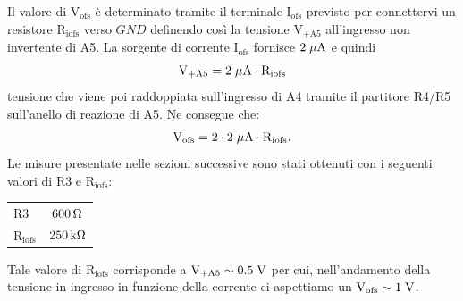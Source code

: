 Il valore di $\mathrm{V_{ofs}}$ è determinato tramite il terminale $\mathrm{I_{ofs}}$ previsto per connettervi un resistore $\mathrm{R_{iofs}}$ verso $GND$ definendo cos\`i la tensione $\mathrm{V_{+A5}}$ all'ingresso non invertente di A5. La sorgente di corrente $\mathrm{I_{ofs}}$ fornisce $2\; \mu \rm A$ e quindi
\begin{equation}
\label{eq:V+a5}
\mathrm{V_{+A5} = 2 \; \mu \rm A \cdot R_{iofs}}
\end{equation}
tensione che viene poi raddoppiata sull'ingresso di A4 tramite il partitore R4/R5 sull'anello di reazione di A5. Ne consegue che:
\begin{equation}
\label{eq:Vofs}
\mathrm{V_{ofs} = 2\cdot 2\; \mu \rm A \cdot R_{iofs}}.
\end{equation}
Le misure presentate nelle sezioni successive sono stati ottenuti con i seguenti valori di R3 e $\mathrm{R_{iofs}}$:
\begin{center}
\begin{tabular}{lc}
\hline
$\mathrm{R3}$ & $600{\rm \, \Omega}$ \\%
$\mathrm{R_{iofs}}$ & $250{\rm \, k\Omega}$\\ 
\hline
\end{tabular}
\end{center}
Tale valore di $\mathrm{R_{iofs}}$ corrisponde a $\mathrm{V_{+A5}\sim0.5\rm \; V}$ per cui, nell'andamento della tensione in ingresso in funzione della corrente ci aspettiamo un $\mathrm{V_{ofs}\sim 1\rm \; V}$.

